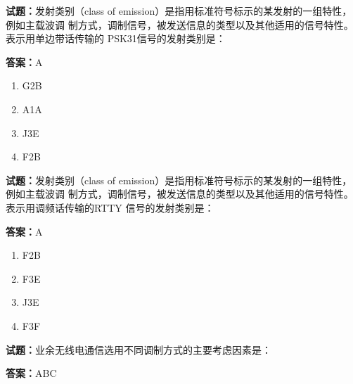 \documentclass{ctexbook}
\begin{document}




\vspace{1em}

\textbf{试题：}发射类别（class of emission）是指用标准符号标示的某发射的一组特性，例如主载波调
制方式，调制信号，被发送信息的类型以及其他适用的信号特性。表示用单边带话传输的
PSK31信号的发射类别是： 

\textbf{答案：}A 

\begin{enumerate}[leftmargin=3em]
  \item G2B 

  \item A1A 

  \item J3E 

  \item F2B 

\end{enumerate}





\vspace{1em}

\textbf{试题：}发射类别（class of emission）是指用标准符号标示的某发射的一组特性，例如主载波调
制方式，调制信号，被发送信息的类型以及其他适用的信号特性。表示用调频话传输的RTTY
信号的发射类别是： 

\textbf{答案：}A 

\begin{enumerate}[leftmargin=3em]
  \item F2B 

  \item F3E 

  \item J3E 


  \item F3F 

\end{enumerate}





\vspace{1em}

\textbf{试题：}业余无线电通信选用不同调制方式的主要考虑因素是： 

\textbf{答案：}ABC 
\end{document}
